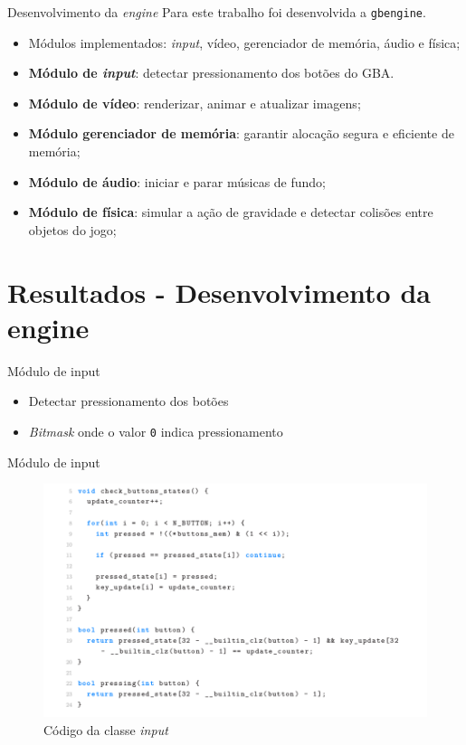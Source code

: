 \documentclass[notes, mathserif]{beamer}
\begin{document}
\begin{frame}{Desenvolvimento da \textit{engine}}
	Para este trabalho foi desenvolvida a \texttt{gbengine}.
	\begin{itemize}[<+->]
		\item M\'odulos implementados: \textit{input}, v\'ideo, gerenciador de mem\'oria, \'audio e f\'isica;
		\item \textbf{M\'odulo de \textit{input}}: detectar pressionamento dos bot\~oes do GBA.
		\item \textbf{M\'odulo de v\'ideo}: renderizar, animar e atualizar imagens;
		\item \textbf{M\'odulo gerenciador de mem\'oria}: garantir aloca\c c\~ao segura e eficiente de mem\'oria;
		\item \textbf{M\'odulo de \'audio}: iniciar e parar m\'usicas de fundo;
		\item \textbf{M\'odulo de f\'isica}: simular a a\c c\~ao de gravidade e detectar colis\~oes entre objetos do jogo;
	\end{itemize}
\end{frame}

\section{Resultados - Desenvolvimento da engine}

\begin{frame}{M\'odulo de input}
	\begin{itemize}
		\item Detectar pressionamento dos bot\~oes
		\item \textit{Bitmask} onde o valor \texttt{0} indica pressionamento
	\end{itemize}
\end{frame}

\begin{frame}{M\'odulo de input}
	\begin{figure}[H]
		\includegraphics[width=.8\linewidth]{figuras/input-codigo.png}
		\centering
		\caption{C\'odigo da classe \textit{input}}
		\label{fig:inputcode}
	\end{figure}
\end{frame}
\end{document}
